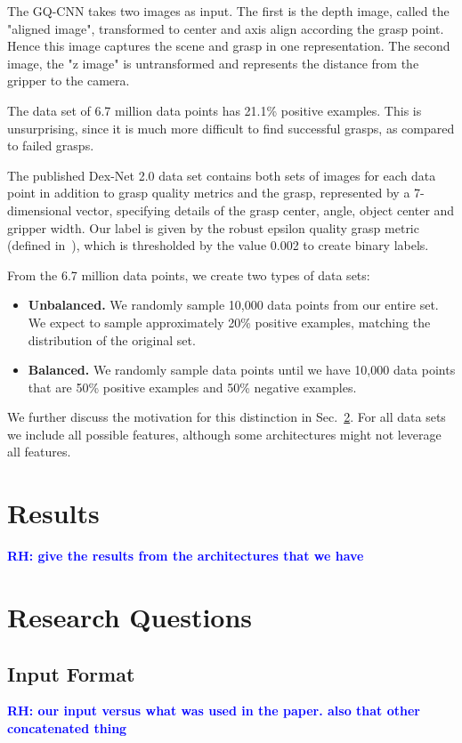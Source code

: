 \documentclass[letterpaper, 10 pt, conference]{../ieeeconf}
\newcommand{\sref}[1]{Sec.~\ref{#1}} %
\newcommand{\rhnote}[1]{\ifthenelse{\boolean{include-notes}}%
 {\textcolor{blue}{\textbf{RH: #1}}}{}}
\begin{document}
The GQ-CNN takes two images as input. The first is the depth image, called the "aligned image", transformed to center and axis align according the grasp point. 
Hence this image captures the scene and grasp in one representation. 
The second image, the "z image" is untransformed and represents the distance from the gripper to the camera.

The data set of 6.7 million data points has 21.1\% positive examples. 
This is unsurprising, since it is much more difficult to find successful grasps, as compared to failed grasps. 

The published Dex-Net 2.0 data set contains both sets of images for each data point in addition to grasp quality metrics and the grasp, represented by a 7-dimensional vector, specifying details of the grasp center, angle, object center and gripper width. 
Our label is given by the robust epsilon quality grasp metric (defined in~\cite{seita2016large}), which is thresholded by the value 0.002 to create binary labels.

From the 6.7 million data points, we create two types of data sets:
\begin{itemize}
    \item \textbf{Unbalanced.} We randomly sample 10,000 data points from our entire set. We expect to sample approximately 20\% positive examples, matching the distribution of the original set.
    \item \textbf{Balanced.} We randomly sample data points until we have 10,000 data points that are 50\% positive examples and 50\% negative examples. 
\end{itemize}
We further discuss the motivation for this distinction in \sref{sec:questions}. 
For all data sets we include all possible features, although some architectures might not leverage all features. 

\section{Results}
\label{sec:results}
\rhnote{give the results from the architectures that we have}

\section{Research Questions}
\label{sec:questions}

\subsection{Input Format}
\rhnote{our input versus what was used in the paper. also that other concatenated thing}
\end{document}
